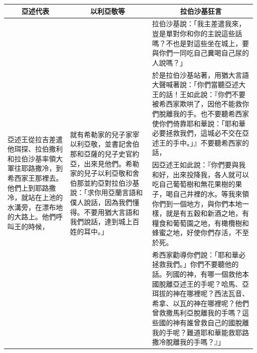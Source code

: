 \begin{table}[H]
\centering
\begin{tabular}{p{1.9cm}|p{2.75cm}|p{}}\hline\hline
\multicolumn{1}{c|}{亞述代表}&\multicolumn{1}{c|}{以利亞敬等}&\multicolumn{1}{c|}{拉伯沙基狂言}\\\hline
\multirow{4}{2.1cm}{亞述王從拉吉差遣他珥探、拉伯撒利和拉伯沙基率領大軍往耶路撒冷，到希西家王那裡去。他們上到耶路撒冷，就站在上池的水溝旁，在漂布地的大路上。他們呼叫王的時候，}
&\multirow{4}{2.9cm}{就有希勒家的兒子家宰以利亞敬，並書記舍伯那和亞薩的兒子史官約亞，出來見他們。希勒家的兒子以利亞敬和舍伯那並約亞對拉伯沙基說：「求你用亞蘭言語和僕人說話，因為我們懂得。不要用猶大言語和我們說話，達到城上百姓的耳中。」}&拉伯沙基說：「我主差遣我來，豈是單對你和你的主說這些話嗎？不也是對這些坐在城上，要與你們一同吃自己糞喝自己尿的人說嗎？」\\\cline{3-3}
&&於是拉伯沙基站著，用猶大言語大聲喊著說：「你們當聽亞述大王的話！王如此說：『你們不要被希西家欺哄了，因他不能救你們脫離我的手。也不要聽希西家使你們倚靠耶和華說：「耶和華必要拯救我們，這城必不交在亞述王的手中。」』不要聽希西家的話，\\\cline{3-3}
&&因亞述王如此說：『你們要與我和好，出來投降我，各人就可以吃自己葡萄樹和無花果樹的果子，喝自己井裡的水。等我來領你們到一個地方，與你們本地一樣，就是有五穀和新酒之地，有糧食和葡萄園之地，有橄欖樹和蜂蜜之地，好使你們存活，不至於死。\\\cline{3-3}
&&希西家勸導你們說：「耶和華必拯救我們。」你們不要聽他的話。列國的神，有哪一個救他本國脫離亞述王的手呢？哈馬、亞珥拔的神在哪裡呢？西法瓦音、希拿、以瓦的神在哪裡呢？他們曾救撒馬利亞脫離我的手嗎？這些國的神有誰曾救自己的國脫離我的手呢？難道耶和華能救耶路撒冷脫離我的手嗎？』」\\\hline
\end{tabular}
\end{table}



